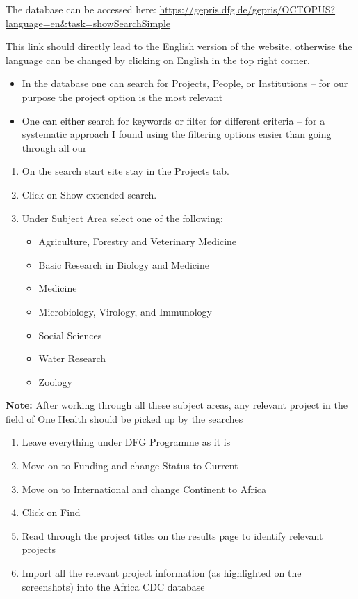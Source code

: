 \documentclass[
]{book}
\begin{document}
The database can be accessed here: \url{https://gepris.dfg.de/gepris/OCTOPUS?language=en\&task=showSearchSimple}

This link should directly lead to the English version of the website, otherwise the language can be changed by clicking on English in the top right corner.

\begin{itemize}
\item
  In the database one can search for Projects, People, or Institutions -- for our purpose the project option is the most relevant
\item
  One can either search for keywords or filter for different criteria -- for a systematic approach I found using the filtering options easier than going through all our
\end{itemize}

\begin{enumerate}
\def\labelenumi{\arabic{enumi}.}
\item
  On the search start site stay in the Projects tab.
\item
  Click on Show extended search.
\item
  Under Subject Area select one of the following:

  \begin{itemize}
  \item
    Agriculture, Forestry and Veterinary Medicine
  \item
    Basic Research in Biology and Medicine
  \item
    Medicine
  \item
    Microbiology, Virology, and Immunology
  \item
    Social Sciences
  \item
    Water Research
  \item
    Zoology
  \end{itemize}
\end{enumerate}

\textbf{Note:} After working through all these subject areas, any relevant project in the field of One Health should be picked up by the searches

\begin{enumerate}
\def\labelenumi{\arabic{enumi}.}
\setcounter{enumi}{3}
\item
  Leave everything under DFG Programme as it is
\item
  Move on to Funding and change Status to Current
\item
  Move on to International and change Continent to Africa
\item
  Click on Find
\item
  Read through the project titles on the results page to identify relevant projects
\item
  Import all the relevant project information (as highlighted on the screenshots) into the Africa CDC database
\end{enumerate}
\end{document}
